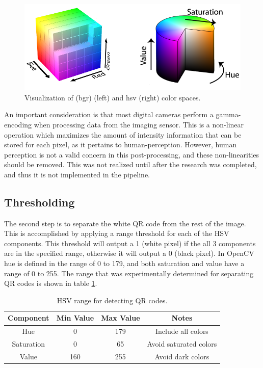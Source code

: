 \begin{figure}[htb]
	\centering
    \includegraphics[width=5.5in]{figures/bgr_and_hsv.png}
    \caption[Color spaces]{Visualization of \ac{(bgr)} (left) and \ac{hsv} (right) color spaces.}
    \label{figure:color_spaces}
\end{figure} 

An important consideration is that most digital cameras perform a gamma-encoding when processing data from the imaging sensor.  This is a non-linear operation which maximizes the amount of intensity information that can be stored for each pixel, as it pertains to human-perception.  However, human perception is not a valid concern in this post-processing, and these non-linearities should be removed.  This was not realized until after the research was completed, and thus it is not implemented in the pipeline.

\subsection{Thresholding}
\label{section:qr_thresholding}

The second step is to separate the white QR code from the rest of the image.  This is accomplished by applying a range threshold for each of the HSV components.  This threshold will output a 1 (white pixel) if the all 3 components are in the specified range, otherwise it will output a 0 (black pixel).  In OpenCV hue is defined in the range of 0 to 179, and both saturation and value have a range of 0 to 255.  The range that was experimentally determined for separating QR codes is shown in table \ref{table:qr_hsv_ranges}.

\begin{table}[htb]
    \begin{center}
    \caption{HSV range for detecting QR codes.}
    \begin{tabular}[c]{|c|c|c|c|}
        \hline
        Component & Min Value & Max Value & Notes \\
        \hline
        Hue        & 0   & 179 & Include all colors      \\
        Saturation & 0   & 65  & Avoid saturated colors  \\
        Value      & 160 & 255 & Avoid dark colors       \\
        \hline
    \end{tabular}
    \label{table:qr_hsv_ranges}
   \end{center}
\end{table}

